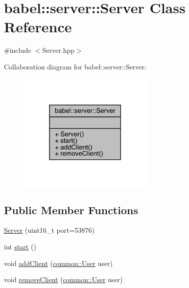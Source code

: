 \hypertarget{classbabel_1_1server_1_1_server}{}\section{babel\+:\+:server\+:\+:Server Class Reference}
\label{classbabel_1_1server_1_1_server}


{\ttfamily \#include $<$Server.\+hpp$>$}



Collaboration diagram for babel\+:\+:server\+:\+:Server\+:\nopagebreak
\begin{figure}[H]
\begin{center}
\leavevmode
\includegraphics[width=189pt]{classbabel_1_1server_1_1_server__coll__graph}
\end{center}
\end{figure}
\subsection*{Public Member Functions}
\begin{DoxyCompactItemize}
\item 
\mbox{\hyperlink{classbabel_1_1server_1_1_server_a45ec873c1eb9c67e4419f14ec2347774}{Server}} (uint16\+\_\+t port=53876)
\item 
int \mbox{\hyperlink{classbabel_1_1server_1_1_server_aa050ebb98ff73cb5be7c6c6854363f18}{start}} ()
\item 
void \mbox{\hyperlink{classbabel_1_1server_1_1_server_ab7dba6c341308689bfec7a023a92562b}{add\+Client}} (\mbox{\hyperlink{classbabel_1_1common_1_1_user}{common\+::\+User}} user)
\item 
void \mbox{\hyperlink{classbabel_1_1server_1_1_server_a922c6d3e23b961fc2453d78210fc946a}{remove\+Client}} (\mbox{\hyperlink{classbabel_1_1common_1_1_user}{common\+::\+User}} user)
\end{DoxyCompactItemize}


